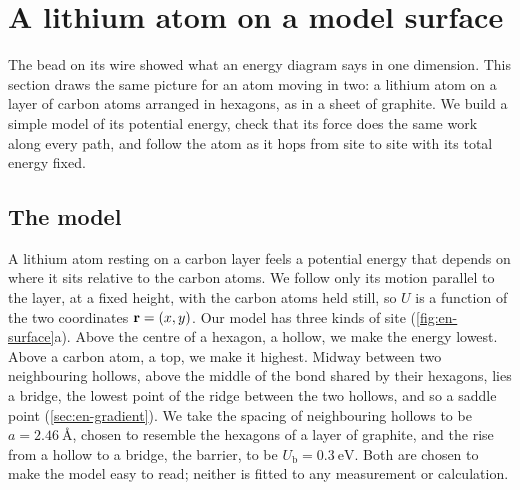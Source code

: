 \section{A lithium atom on a model surface}
\label{sec:en-surface}

The bead on its wire showed what an energy diagram says in one dimension.
This section draws the same picture for an atom moving in two: a lithium
atom on a layer of carbon atoms arranged in hexagons, as in a sheet of
graphite. We build a simple model of its potential energy, check that
its force does the same work along every path, and follow the atom as it
hops from site to site with its total energy fixed.

\subsection*{The model}

A lithium atom resting on a carbon layer feels a potential energy that
depends on where it sits relative to the carbon atoms. We follow only its
motion parallel to the layer, at a fixed height, with the carbon atoms
held still, so $U$ is a function of the two coordinates $\bm{\mathrm{r}} = (x,
y)$. Our model has three kinds of site (\cref{fig:en-surface}a). Above
the centre of a hexagon, a hollow, we make the energy lowest. Above a
carbon atom, a top, we make it highest. Midway between two neighbouring hollows, above the middle
of the bond shared by their hexagons, lies a bridge, the lowest point of
the ridge between the two hollows, and so a saddle point
(\cref{sec:en-gradient}). We take the spacing of neighbouring hollows to
be $a = \SI{2.46}{\angstrom}$, chosen to resemble the hexagons of a layer
of graphite, and the rise from a hollow to a bridge, the barrier, to be $U_{\mathrm b} =
\SI{0.3}{\electronvolt}$. Both are chosen to make the model easy to read;
neither is fitted to any measurement or calculation.

